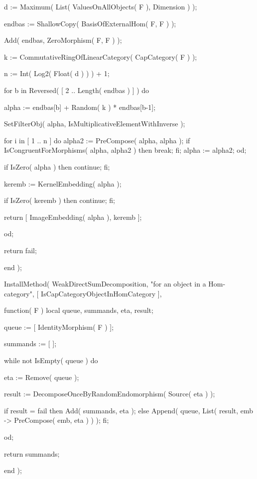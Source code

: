     d := Maximum( List( ValuesOnAllObjects( F ), Dimension ) );
    
    endbas := ShallowCopy( BasisOfExternalHom( F, F ) );
    
    Add( endbas, ZeroMorphism( F, F ) );
    
    k := CommutativeRingOfLinearCategory( CapCategory( F ) );
    
    n := Int( Log2( Float( d ) ) ) + 1;
    
    for b in Reversed( [ 2 .. Length( endbas ) ] ) do
        
        alpha := endbas[b] + Random( k ) * endbas[b-1];
        
        SetFilterObj( alpha, IsMultiplicativeElementWithInverse );
        
        for i in [ 1 .. n ] do
            alpha2 := PreCompose( alpha, alpha );
            if IsCongruentForMorphisms( alpha, alpha2 ) then
                break;
            fi;
            alpha := alpha2;
        od;
        
        if IsZero( alpha ) then
            continue;
        fi;
        
        keremb := KernelEmbedding( alpha );
        
        if IsZero( keremb ) then
            continue;
        fi;
        
        return [ ImageEmbedding( alpha ), keremb ];
        
    od;
    
    return fail;
    
end );


InstallMethod( WeakDirectSumDecomposition,
        "for an object in a Hom-category",
        [ IsCapCategoryObjectInHomCategory ],
        
  function( F )
    local queue, summands, eta, result;
    
    queue := [ IdentityMorphism( F ) ];
    
    summands := [ ];
    
    while not IsEmpty( queue ) do
        
        eta := Remove( queue );
        
        result := DecomposeOnceByRandomEndomorphism( Source( eta ) );
        
        if result = fail then
            Add( summands, eta );
        else
            Append( queue, List( result, emb -> PreCompose( emb, eta ) ) );
        fi;
        
    od;
    
    return summands;
    
end );



















